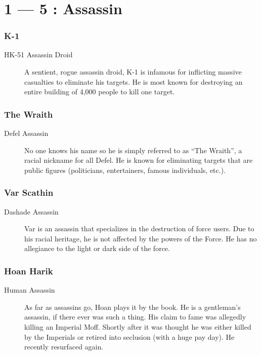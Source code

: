 \documentclass{article}
\begin{document}
\title{\vspace{-0.5cm}{\Huge NPCs} \vspace{-1cm}}

\date{}

\maketitle

\part*{1 --- 5 : Assassin}
\section{K-1}
\begin{description}
	\item [HK-51 Assassin Droid] A sentient, rogue assassin droid, K-1 is infamous for inflicting massive casualties to eliminate his targets. He is most known for destroying an entire building of 4,000 people to kill one target.
\end{description}
\section{The Wraith}
\begin{description}
	\item [Defel \male Assassin] No one knows his name so he is simply referred to as “The Wraith”, a racial nickname for all Defel. He is known for eliminating targets that are public figures (politicians, entertainers, famous individuals, etc.).
\end{description}
\section{Var Scathin}
\begin{description}
	\item [Dashade \male Assassin] Var is an assassin that specializes in the destruction of force users. Due to his racial heritage, he is not affected by the powers of the Force. He has no allegiance to the light or dark side of the force.
\end{description}
\section{Hoan Harik}
\begin{description}
	\item [Human \male Assassin] As far as assassins go, Hoan plays it by the book. He is a gentleman’s assassin, if there ever was such a thing. His claim to fame was allegedly killing an Imperial Moff. Shortly after it was thought he was either killed by the Imperials or retired into seclusion (with a huge pay day). He recently resurfaced again.
\end{description}
\end{document}
